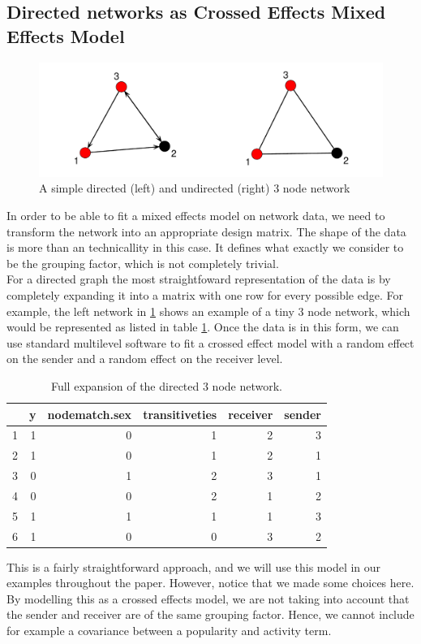 \documentclass[a4paper]{article}
\begin{document}
  
\subsection{Directed networks as Crossed Effects Mixed Effects Model}

\begin{figure}[h!]
\centering
\includegraphics{paper-mininet}
\caption{A simple directed (left) and undirected (right) 3 node network}
\label{fig:mininet1}
\end{figure}

In order to be able to fit a mixed effects model on network data, we need to transform the network into an appropriate design matrix. The shape of the data
is more than an technicallity in this case. It defines what exactly we consider to be the grouping factor, which is not completely trivial. \\

For a directed graph the most straightfoward representation of the data is by completely expanding it into a matrix with one row 
for every possible edge. For example, the left network in \ref{fig:mininet1} shows an example of a tiny 3 node network,
which would be represented as listed in table \ref{minitable}. Once the data is in this form, we can use standard multilevel software
to fit a crossed effect model with a random effect on the sender and a random effect on the receiver level. 


\begin{table}[ht]
\begin{center}
\begin{tabular}{rrrrrr}
  \hline
 & y & nodematch.sex & transitiveties & receiver & sender \\ 
  \hline
1 & 1 & 0 & 1 & 2 & 3 \\ 
  2 & 1 & 0 & 1 & 2 & 1 \\ 
  3 & 0 & 1 & 2 & 3 & 1 \\ 
  4 & 0 & 0 & 2 & 1 & 2 \\ 
  5 & 1 & 1 & 1 & 1 & 3 \\ 
  6 & 1 & 0 & 0 & 3 & 2 \\ 
   \hline
\end{tabular}
\caption{Full expansion of the directed 3 node network.}
\label{minitable}
\end{center}
\end{table}
This is a fairly straightforward approach, and we will use this model in our examples throughout the paper. However, notice that we made
some choices here. By modelling this as a crossed effects model, we are not taking into account that the sender and receiver are of the same grouping factor.
Hence, we cannot include for example a covariance between a popularity and activity term. 
\end{document}
